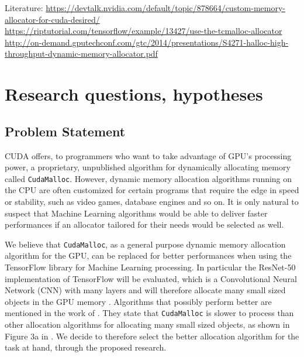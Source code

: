 \documentclass[12pt,twoside]{article}
\begin{document}
Literature:
\url{https://devtalk.nvidia.com/default/topic/878664/custom-memory-allocator-for-cuda-desired/}
\url{https://riptutorial.com/tensorflow/example/13427/use-the-tcmalloc-allocator}
\url{http://on-demand.gputechconf.com/gtc/2014/presentations/S4271-halloc-high-throughput-dynamic-memory-allocator.pdf}


\section{Research questions, hypotheses}
\label{sect:questions}

\subsection{Problem Statement}
\label{sec:problem-statement}



CUDA offers, to programmers who want to take advantage of GPU's processing power, a proprietary, unpublished algorithm for dynamically allocating memory called \texttt{CudaMalloc}. However, dynamic memory allocation algorithms running on the CPU are often customized for certain programs that require the edge in speed or stability, such as video games, database engines and so on. It is only natural to suspect that Machine Learning algorithms would be able to deliver faster performances if an allocator tailored for their needs would be selected as well.

We believe that \texttt{CudaMalloc}, as a general purpose dynamic memory allocation algorithm for the GPU, can be replaced for better performances when using the TensorFlow \cite{abadi2016} library for Machine Learning processing. In particular the ResNet-50 implementation of TensorFlow will be evaluated, which is a Convolutional Neural Network (CNN) with many layers and will therefore allocate many small sized objects in the GPU memory \cite{DBLP:HeZRS15}.
Algorithms that possibly perform better are mentioned in the work of \citeauthor{Vinkler2015} \cite{Vinkler2015}. They state that \texttt{CudaMalloc} is slower to process than other allocation algorithms for allocating many small sized objects, as shown in Figure 3a in \cite{Vinkler2015}. We decide to therefore select the better allocation algorithm for the task at hand, through the proposed research.
\end{document}
